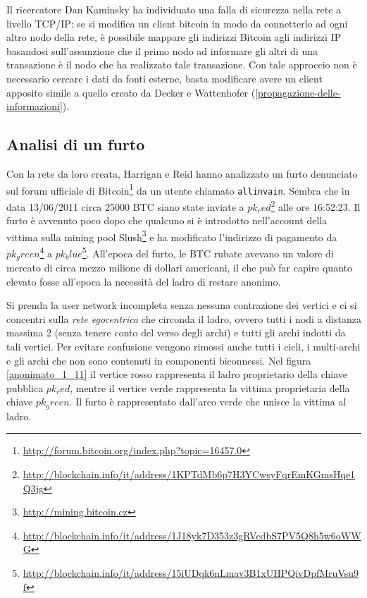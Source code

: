 Il ricercatore Dan Kaminsky ha individuato una falla di sicurezza nella rete a livello TCP/IP: se si modifica un client bitcoin in modo da connetterlo ad ogni altro nodo della rete, è possibile mappare gli indirizzi Bitcoin agli indirizzi IP basandosi sull'assunzione che il primo nodo ad informare gli altri di una transazione è il nodo che ha realizzato tale transazione. Con tale approccio non è necessario cercare i dati da fonti esterne, basta modificare avere un client apposito simile a quello creato da Decker e Wattenhofer (\ref{propagazione-delle-informazioni}).

\subsection{Analisi di un furto}


Con la rete da loro creata, Harrigan e Reid hanno analizzato un furto denunciato sul forum ufficiale di Bitcoin\footnote{\url{http://forum.bitcoin.org/index.php?topic=16457.0}} da un utente chiamato \verb|allinvain|. Sembra che in data 13/06/2011 circa 25000 BTC siano state inviate a $pk_red$\footnote{\url{http://blockchain.info/it/address/1KPTdMb6p7H3YCwsyFqrEmKGmsHqe1Q3jg}} alle ore 16:52:23. Il furto è avvenuto poco dopo che qualcuno si è introdotto nell'account della vittima sulla mining pool Slush\footnote{\url{http://mining.bitcoin.cz}} e ha modificato l'indirizzo di pagamento da $pk_green$\footnote{\url{http://blockchain.info/it/address/1J18yk7D353z3gRVcdbS7PV5Q8h5w6oWWG}} a $pk_blue$\footnote{\url{http://blockchain.info/it/address/15iUDqk6nLmav3B1xUHPQivDpfMruVsu9f}}. All'epoca del furto, le BTC rubate avevano un valore di mercato di circa mezzo milione di dollari americani, il che può far capire quanto elevato fosse all'epoca la necessità del ladro di restare anonimo.

Si prenda la user network incompleta senza nessuna contrazione dei vertici e ci si concentri sulla \emph{rete egocentrica} che circonda il ladro, ovvero tutti i nodi a distanza massima 2 (senza tenere conto del verso degli archi) e tutti gli archi indotti da tali vertici. Per evitare confusione vengono rimossi anche tutti i cicli, i multi-archi e gli archi che non sono contenuti in componenti biconnessi. Nel figura \ref{anonimato_1_11} il vertice rosso rappresenta il ladro proprietario della chiave pubblica $pk_red$, mentre il vertice verde rappresenta la vittima proprietaria della chiave $pk_green$. Il furto è rappresentato dall'arco verde che unisce la vittima al ladro.

